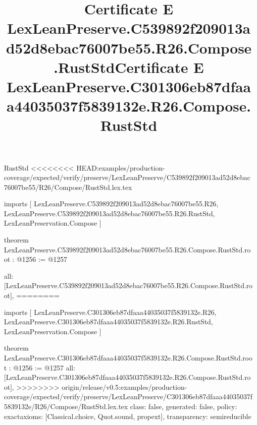 \begin{lexlean}{RustStd}
<<<<<<<< HEAD:examples/production-coverage/expected/verify/preserve/LexLeanPreserve/C539892f209013ad52d8ebac76007be55/R26/Compose/RustStd.lex.tex
\title{Certificate E LexLeanPreserve.C539892f209013ad52d8ebac76007be55.R26.Compose.RustStd}
\begin{coremodule}
imports [
  LexLeanPreserve.C539892f209013ad52d8ebac76007be55.R26,
  LexLeanPreserve.C539892f209013ad52d8ebac76007be55.R26.RustStd,
  LexLeanPreservation.Compose
]

theorem LexLeanPreserve.C539892f209013ad52d8ebac76007be55.R26.Compose.RustStd.root : @1256 := @1257 {
  all: [LexLeanPreserve.C539892f209013ad52d8ebac76007be55.R26.Compose.RustStd.root],
========
\title{Certificate E LexLeanPreserve.C301306eb87dfaaa44035037f5839132e.R26.Compose.RustStd}
\begin{coremodule}
imports [
  LexLeanPreserve.C301306eb87dfaaa44035037f5839132e.R26,
  LexLeanPreserve.C301306eb87dfaaa44035037f5839132e.R26.RustStd,
  LexLeanPreservation.Compose
]

theorem LexLeanPreserve.C301306eb87dfaaa44035037f5839132e.R26.Compose.RustStd.root : @1256 := @1257 {
  all: [LexLeanPreserve.C301306eb87dfaaa44035037f5839132e.R26.Compose.RustStd.root],
>>>>>>>> origin/release/v0.5:examples/production-coverage/expected/verify/preserve/LexLeanPreserve/C301306eb87dfaaa44035037f5839132e/R26/Compose/RustStd.lex.tex
  class: false,
  generated: false,
  policy: exact{axioms: [Classical.choice, Quot.sound, propext]},
  transparency: semireducible
}


\end{coremodule}}
\end{coremodule}
\end{lexlean}
